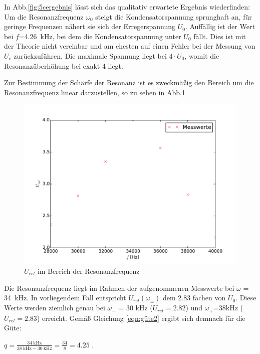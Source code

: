 In Abb.\ref{fig:5cergebnis} lässt sich das qualitativ erwartete Ergebnis
wiederfinden: Um die Resonanzfrequenz $\omega_0$ steigt die Kondensatorspannung
sprunghaft an, für geringe Frequenzen nähert sie sich der Erregerspannung $U_0$.
Auffällig ist der Wert bei $f$=\SI{4.26}{\kilo\hertz},
bei dem die Kondensatorspannung unter
$U_0$ fällt. Dies ist mit der Theorie nicht vereinbar und am ehesten auf einen
Fehler bei der Messung von $U_c$ zurückzuführen. Die maximale Spannung liegt
bei $4\cdot U_0$, womit die Resonanzüberhöhung bei exakt 4 liegt.

Zur Bestimmung der Schärfe der Resonanz ist es zweckmäßig den Bereich um die
Resonanzfrequenz linear darzustellen, so zu sehen in Abb.\ref{fig:5clin}
\begin{figure}
  \centering
  \includegraphics[width=\textwidth]{5c2.pdf}
  \caption{$U_{rel}$ im Bereich der Resonanzfrequenz}
  \label{fig:5clin}
\end{figure}
Die Resonanzfrequenz liegt im Rahmen der aufgenommenen Messwerte bei
$\omega$ = \SI{34}{\kilo\hertz}.
In vorliegendem Fall entspricht $U_{rel}(\omega_{\pm})$ dem 2.83 fachen von $U_0$.
Diese Werte werden ziemlich genau bei $\omega_-$ = 30 kHz ($U_{rel}=2.82$) und
$\omega_+$=38kHz ($U_{rel} = 2.83$) erreicht. Gemäß Gleichung \ref{eqn:güte2} ergibt
sich demnach für die Güte:

$q = \frac{\SI{34}{\kilo\hertz}}{\SI{38}{\kilo\hertz}-\SI{30}{\kilo\hertz}}
 = \frac{34}{8} = 4.25$ .

